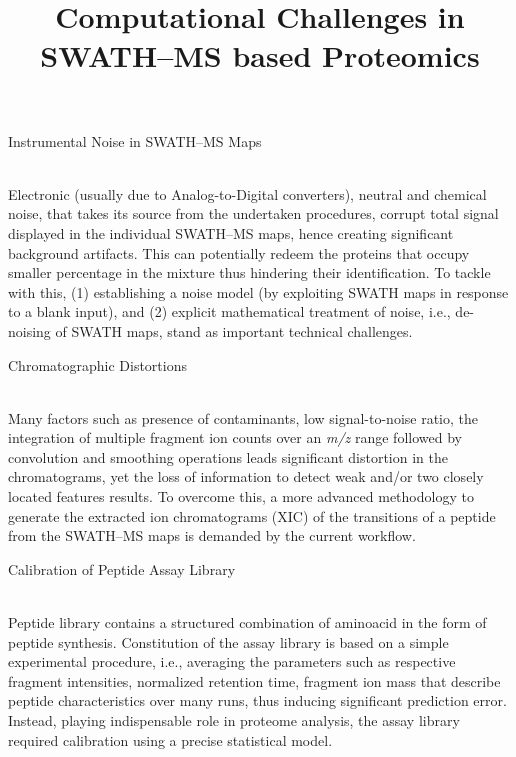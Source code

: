 \documentclass{nature}
\title{\large Computational Challenges in SWATH--MS based Proteomics}%
\author{ }
\begin{document}
\maketitle
\begin{enumerate}
    {\bf \item Instrumental Noise in SWATH--MS Maps}\\
    Electronic (usually due to Analog-to-Digital converters), neutral and chemical noise, that takes its source from the undertaken procedures, corrupt total signal displayed in the individual SWATH--MS maps, hence creating significant background artifacts. This can potentially redeem the proteins that occupy smaller percentage in the mixture thus hindering their identification. To tackle with this, (1) establishing a noise model (by exploiting SWATH maps in response to a blank input), and (2) explicit mathematical treatment of noise, i.e., de-noising of SWATH maps, stand as important technical challenges.
    
    {\bf \item Chromatographic Distortions}\\
    Many factors such as presence of contaminants, low signal-to-noise ratio, the integration of multiple fragment ion counts over an {\it m/z} range followed by convolution and smoothing operations leads significant distortion in the chromatograms, yet the loss of information to detect weak and/or two closely located features results. To overcome this, a more advanced methodology to generate the extracted ion chromatograms (XIC) of the transitions of a peptide from the SWATH--MS maps is demanded by the current workflow.
    
    {\bf \item Calibration of Peptide Assay Library}\\
    Peptide library contains a structured combination of aminoacid in the form of peptide synthesis. Constitution of the assay library is based on a simple experimental procedure, i.e., averaging the parameters such as respective fragment intensities, normalized retention time, fragment ion mass that describe peptide characteristics over many runs, thus inducing significant prediction error. Instead, playing indispensable role in proteome analysis, the assay library required calibration using a precise statistical model.
    

\end{enumerate}
\end{document}
